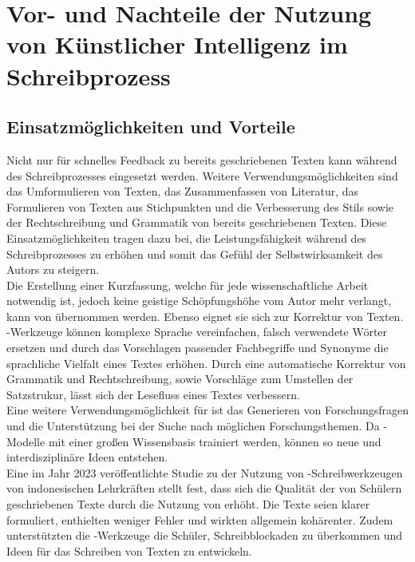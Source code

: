 \documentclass[../main.tex]{subfiles}
\begin{document}
\section{Vor- und Nachteile der Nutzung von Künstlicher Intelligenz im Schreibprozess}

\subsection{Einsatzmöglichkeiten und Vorteile}
\label{sec:vorteile}

Nicht nur für schnelles Feedback zu bereits geschriebenen Texten kann  während des Schreibprozesses eingesetzt werden. 
Weitere Verwendungsmöglichkeiten sind das Umformulieren von Texten, das Zusammenfassen von Literatur, das Formulieren von Texten aus Stichpunkten und die Verbesserung des Stils sowie der Rechtschreibung und Grammatik von bereits geschriebenen Texten. Diese Einsatzmöglichkeiten 
tragen dazu bei, die Leistungsfähigkeit während des Schreibprozesses zu erhöhen und somit das Gefühl der Selbstwirksamkeit des Autors zu steigern. \cite{SelfEfficacyBeliefs}\\
Die Erstellung einer Kurzfassung, welche für jede wissenschaftliche Arbeit notwendig ist, jedoch keine geistige Schöpfungshöhe vom Autor mehr verlangt, 
kann von  übernommen werden. Ebenso eignet sie sich zur Korrektur von Texten. -Werkzeuge können komplexe Sprache vereinfachen, falsch 
verwendete Wörter ersetzen und durch das Vorschlagen passender Fachbegriffe und Synonyme die sprachliche Vielfalt eines Textes erhöhen. Durch eine 
automatische Korrektur von Grammatik und Rechtschreibung, sowie Vorschläge zum Umstellen der Satzstrukur, lässt sich der Lesefluss eines Textes verbessern.\cite{ZukunftWissenschaftlichesPublizieren,teachers}\\
Eine weitere Verwendungsmöglichkeit für  ist das Generieren von Forschungsfragen und die Unterstützung bei der Suche nach möglichen Forschungsthemen. Da -Modelle mit einer großen Wissensbasis trainiert werden, 
können so neue und interdisziplinäre Ideen entstehen.\cite{ZukunftWissenschaftlichesPublizieren,humanWritingToAi}\\
Eine im Jahr 2023 veröffentlichte Studie zu der Nutzung von -Schreibwerkzeugen von indonesischen Lehrkräften stellt fest, dass sich die Qualität der von 
Schülern geschriebenen Texte durch die Nutzung von  erhöht. Die Texte seien klarer formuliert, enthielten weniger Fehler und 
wirkten allgemein kohärenter. Zudem unterstützten die -Werkzeuge die Schüler, Schreibblockaden zu überkommen und Ideen für das Schreiben von Texten zu entwickeln.\cite{teachers} 
\end{document}
